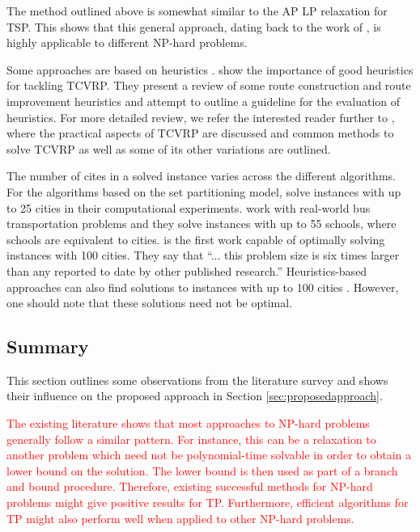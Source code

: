\documentclass{mprop}
\theoremstyle{definition}
\begin{document}
The method outlined above is somewhat similar to the AP LP relaxation for TSP. This shows that this general approach, dating back to the work of \citet{Dantzig54}, is highly applicable to different NP-hard problems.

Some approaches are based on heuristics \citep{Tan99heuristicmethods,Cheng09}. \citet{Braysy05,Braysy05a} show the importance of good heuristics for tackling TCVRP. They present a review of some route construction and route improvement heuristics and attempt to outline a guideline for the evaluation of heuristics.
For more detailed review, we refer the interested reader further to \citet{Toth14}, where the practical aspects of TCVRP are discussed and common methods to solve TCVRP as well as some of its other variations are outlined.

The number of cites in a solved instance varies across the different algorithms. For the algorithms based on the set partitioning model, \citet{Agarwal89} solve instances with up to 25 cities in their computational experiments. \citet{Desrosiers84} work with real-world bus transportation problems and they solve instances with up to 55 schools, where schools are equivalent to cities. \citet{Desrochers92} is the first work capable of optimally solving instances with 100 cities. They say that ``... this problem size is six times larger than any reported to date by other published research.''
Heuristics-based approaches can also find solutions to instances with up to 100 cities \citep{Tan99heuristicmethods}. However, one should note that these solutions need not be optimal. 

\subsection{Summary}

This section outlines some observations from the literature survey and shows their influence on the proposed approach in Section \ref{sec:proposedapproach}.

\textcolor{red}{
The existing literature shows that most approaches to NP-hard problems generally follow a similar pattern. For instance, this can be a relaxation to another problem which need not be polynomial-time solvable in order to obtain a lower bound on the solution. The lower bound is then used as part of a branch and bound procedure. Therefore, existing successful methods for NP-hard problems might give positive results for TP. Furthermore, efficient algorithms for TP might also perform well when applied to other NP-hard problems.}
\end{document}

